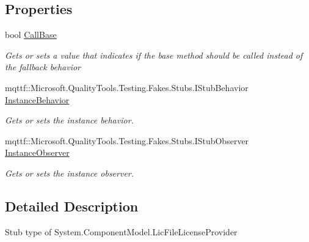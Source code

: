 \subsection*{Properties}
\begin{DoxyCompactItemize}
\item 
bool \hyperlink{class_system_1_1_component_model_1_1_fakes_1_1_stub_lic_file_license_provider_ae94bbc1153bac356ba70c4bf3e5bf165}{Call\-Base}
\begin{DoxyCompactList}\small\item\em Gets or sets a value that indicates if the base method should be called instead of the fallback behavior\end{DoxyCompactList}\item 
mqttf\-::\-Microsoft.\-Quality\-Tools.\-Testing.\-Fakes.\-Stubs.\-I\-Stub\-Behavior \hyperlink{class_system_1_1_component_model_1_1_fakes_1_1_stub_lic_file_license_provider_a9b60509eeb598db8001501a89b92f6e9}{Instance\-Behavior}
\begin{DoxyCompactList}\small\item\em Gets or sets the instance behavior.\end{DoxyCompactList}\item 
mqttf\-::\-Microsoft.\-Quality\-Tools.\-Testing.\-Fakes.\-Stubs.\-I\-Stub\-Observer \hyperlink{class_system_1_1_component_model_1_1_fakes_1_1_stub_lic_file_license_provider_a00d038a88d85848890b2430ea8b34d13}{Instance\-Observer}
\begin{DoxyCompactList}\small\item\em Gets or sets the instance observer.\end{DoxyCompactList}\end{DoxyCompactItemize}


\subsection{Detailed Description}
Stub type of System.\-Component\-Model.\-Lic\-File\-License\-Provider



